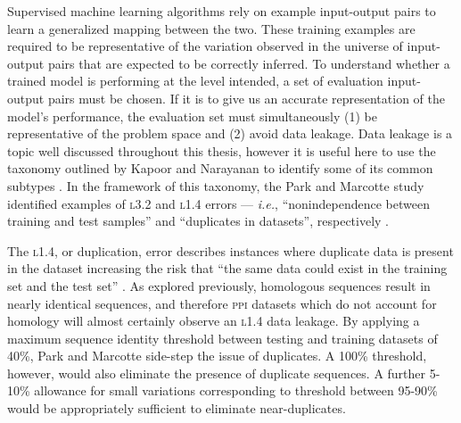Supervised machine learning algorithms rely on example input-output pairs to learn a generalized mapping between the two. These training examples are required to be representative of the variation observed in the universe of input-output pairs that are expected to be correctly inferred. To understand whether a trained model is performing at the level intended, a set of evaluation input-output pairs must be chosen. If it is to give us an accurate representation of the model's performance, the evaluation set must simultaneously (1) be representative of the problem space and (2) avoid data leakage. Data leakage is a topic well discussed throughout this thesis, however it is useful here to use the taxonomy outlined by Kapoor and Narayanan to identify some of its common subtypes \cite{Kapoor_Narayanan_2023}. In the framework of this taxonomy, the Park and Marcotte study identified examples of  \textsc{l3.2} and \textsc{l1.4} errors --- \textit{i.e.}, ``nonindependence between training and test samples'' and ``duplicates in datasets'', respectively \cite{park_marcotte, Kapoor_Narayanan_2023}.

The \textsc{l1.4}, or duplication, error describes instances where duplicate data is present in the dataset increasing the risk that ``the same data could exist in the training set and the test set'' \cite{Kapoor_Narayanan_2023}. As explored previously, homologous sequences result in nearly identical sequences, and therefore \textsc{ppi} datasets which do not account for homology will almost certainly observe an \textsc{l1.4} data leakage. By applying a maximum sequence identity threshold between testing and training datasets of 40\%, Park and Marcotte side-step the issue of duplicates. A 100\% threshold, however, would also eliminate the presence of duplicate sequences. A further 5-10\% allowance for small variations corresponding to threshold between 95-90\% would be appropriately sufficient to eliminate near-duplicates.


